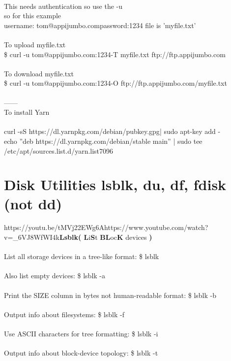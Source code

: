 \documentclass[10pt,a4paper]{article}
\begin{document}
{{{{{{{{{\\
This needs authentication so use the -u\\
so for this example \\
username: tom@appijumbo.com}{\large    password:1234  file is 'myfile.txt'\\
\\
To upload myfile.txt\\
\$ curl -u tom@appijumbo.com:1234}{\large   -T myfile.txt ftp://ftp.appijumbo.com}{\large \\
\\
To download myfile.txt\\
\$ curl -u tom@appijumbo.com:1234}{\large   -O ftp://ftp.appijumbo.com/myfile.txt}{\large \\
\\
------\\
To install Yarn\\
\\
curl -sS https://dl.yarnpkg.com/debian/pubkey.gpg}{\large  | sudo apt-key add -\\
echo ''deb https://dl.yarnpkg.com/debian/}{\large  stable main'' | sudo tee /etc/apt/sources.list.d/yarn.list}{\large }7096
\hypertarget{disk_utilities__lsblk,_du,_df,_fdisk__(not_dd)}{\section {Disk Utilities  lsblk, du, df, fdisk  (not dd)}}
https://youtu.be/tMVj22EWg6Ahttps://www.youtube.com/watch?v=\_6VJ8WfWI4k\textbf{{\large Lsblk}}\textbf{{\large   ( L}}{\large i\textbf{S}}{\large t \textbf{BL}}{\large oc\textbf{K }}{\large devices\textbf{ )}}{\large \\
\\
List all storage devices in a tree-like format: 	\$ lsblk\\
\\
Also list empty devices:  	\$ lsblk -a\\
\\
Print the SIZE column in bytes not human-readable format:	\$ lsblk -b\\
\\
Output info about filesystems:		\$ lsblk -f\\
\\
Use ASCII characters for tree formatting:	\$ lsblk -i\\
\\
Output info about block-device topology:	\$ lsblk -t\\
  \\
}}}}}}}}}
\end{document}
